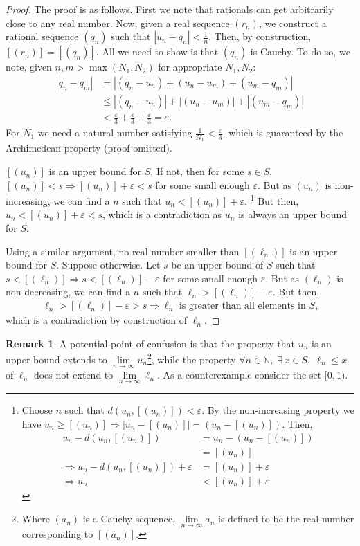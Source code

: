 \documentclass{article}
\theoremstyle{definition}
\newtheorem{rmk}{Remark}[subsubsection]
\begin{document}
\begin{proof}
	The proof is as follows. First we note that rationals can get arbitrarily close to any real number. Now, given a real sequence $(r_n)$, we construct a rational sequence $(q_n)$ such that $|u_n-q_n|<\frac{1}{n}$. Then, by construction, $[(r_n)]=[(q_n)]$. All we need to show is that $(q_n)$ is Cauchy. To do so, we note, given $n,m>\max(N_1,N_2)$ for appropriate $N_1,N_2$:
	\begin{align*}
		|q_n-q_m|&=|(q_n-u_n)+(u_n-u_m)+(u_m-q_m)|\\
		&\leq|(q_n-u_n)|+|(u_n-u_m)|+|(u_m-q_m)|\\
		&<\frac{\varepsilon}{3}+\frac{\varepsilon}{3}+\frac{\varepsilon}{3}=\varepsilon.
	\end{align*}
	For $N_1$ we need a natural number satisfying $\frac{1}{N_1}<\frac{\varepsilon}{3}$, which is guaranteed by the Archimedean property (proof omitted).\par
	$[(u_n)]$ is an upper bound for $S$. If not, then for some $s\in S$, $[(u_n)]<s\Rightarrow [(u_n)]+\varepsilon<s$ for some small enough $\varepsilon$. But as $(u_n)$ is non-increasing, we can find a $n$ such that $u_n<[(u_n)]+\varepsilon$.
	\footnote
	{	
		Choose $n$ such that $d(u_n,[(u_n)])<\varepsilon$. By the non-increasing property we have $u_n\geq[(u_n)]\Rightarrow|u_n-[(u_n)]|=(u_n-[(u_n)])$. Then,
		\begin{align*}
			u_n-d(u_n,[(u_n)])&=u_n-(u_n-[(u_n)])\\
			&=[(u_n)]\\
			\Rightarrow u_n-d(u_n,[(u_n)])+\varepsilon&=[(u_n)]+\varepsilon\\
			\Rightarrow u_n&<[(u_n)]+\varepsilon
		\end{align*}
	}
	But then, $u_n<[(u_n)]+\varepsilon<s$, which is a contradiction as $u_n$ is always an upper bound for $S$.\par

	Using a similar argument, no real number smaller than $[(\ell_n)]$ is an upper bound for $S$. Suppose otherwise. Let $s$ be an upper bound of $S$ such that $s<[(\ell_n)]\Rightarrow s<[(\ell_n)]-\varepsilon$ for some small enough $\varepsilon$. But as $(\ell_n)$ is non-decreasing, we can find a $n$ such that $\ell_n>[(\ell_n)]-\varepsilon$. But then,
	\begin{align*}
		\ell_n>[(\ell_n)]-\varepsilon>s\Rightarrow\ell_n\text{ is greater than all elements in $S$,}
	\end{align*} 
	which is a contradiction by construction of $\ell_n$.
\end{proof}
\begin{rmk}
	A potential point of confusion is that the property that $u_n$ is an upper bound extends to $\lim\limits_{n\rightarrow \infty}u_n$\footnote{Where $(a_n)$ is a Cauchy sequence, $\lim\limits_{n\rightarrow \infty}a_n$ is defined to be the real number corresponding to $[(a_n)]$.}, while the property $\forall n\in \mathbb{N},\;\exists\,x\in S,\;\ell_n\leq x$ of $\ell_n$ does not extend to $\lim\limits_{n\rightarrow \infty}\ell_n$. As a counterexample consider the set $[0,1)$. 
\end{rmk}
\newpage
\end{document}

